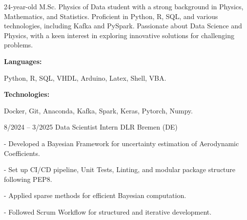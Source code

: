 \documentclass[9pt]{developercv} %
\begin{document}
\begin{minipage}[t]{0.46\textwidth}
	\vspace{-6pt}
 
	24-year-old M.Sc. Physics of Data student with a strong background in Physics, Mathematics, and Statistics. Proficient in Python, R, SQL, and various technologies, including Kafka and PySpark. Passionate about Data Science and Physics, with a keen interest in exploring innovative solutions for challenging problems.\\
 
\end{minipage}
\hfill %
\begin{minipage}[t]{0.465\textwidth}
    \vspace{-6pt}
    
    \begin{minipage}[t]{0.2\textwidth}
        \textbf{Languages:}
    \end{minipage}
    \hfill
    \begin{minipage}[t]{0.73\textwidth}
      Python, R, SQL, VHDL, Arduino, Latex, Shell, VBA.  
    \end{minipage}
    \vspace{4mm}
    
    \begin{minipage}[t]{0.2\textwidth}
        \textbf{Technologies:}
    \end{minipage}
    \hfill
    \begin{minipage}[t]{0.73\textwidth}
      Docker, Git, Anaconda, Kafka, Spark, Keras, Pytorch, Numpy.
    \end{minipage}
    
\end{minipage}


\vspace{-10 pt}
\begin{entrylist}
	\entry
        {8/2024 -- 3/2025}
		{Data Scientist Intern}
		{DLR Bremen (DE)}
            {- Developed a Bayesian Framework for uncertainty estimation of Aerodynamic Coefficients. 
            
            - Set up CI/CD pipeline, Unit Tests, Linting, and modular package structure following PEP8.
            
            - Applied sparse methods for efficient Bayesian computation.
            
            - Followed Scrum Workflow for structured and iterative development.}
		
\end{entrylist}
\end{document}
